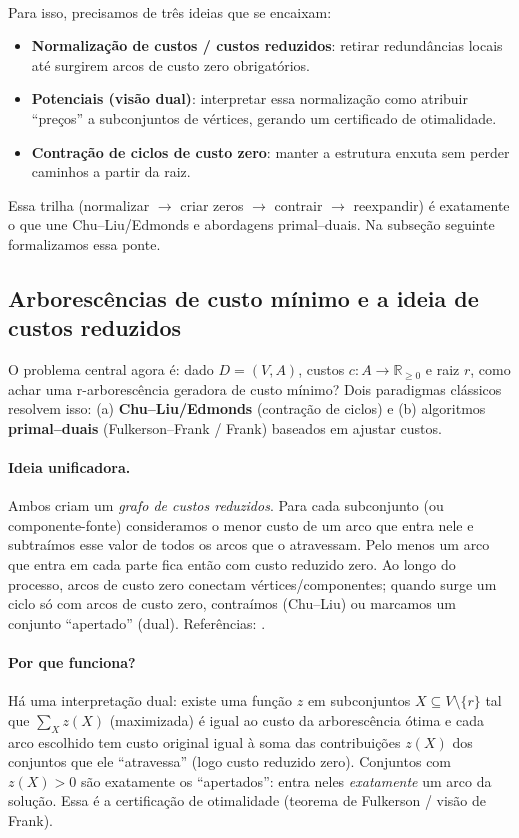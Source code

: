 \documentclass[12pt,a4paper]{article}
\begin{document}
\paragraph{}
Para isso, precisamos de três ideias que se encaixam:
\begin{itemize}\setlength{\itemsep}{2pt}
    \item \textbf{Normalização de custos / custos reduzidos}: retirar redundâncias locais até surgirem arcos de custo zero obrigatórios.
    \item \textbf{Potenciais (visão dual)}: interpretar essa normalização como atribuir “preços” a subconjuntos de vértices, gerando um certificado de otimalidade.
    \item \textbf{Contração de ciclos de custo zero}: manter a estrutura enxuta sem perder caminhos a partir da raiz.
\end{itemize}
Essa trilha (normalizar \(\to\) criar zeros \(\to\) contrair \(\to\) reexpandir) é exatamente o que une Chu--Liu/Edmonds e abordagens primal--duais. Na subseção seguinte formalizamos essa ponte.


\subsection{Arborescências de custo mínimo e a ideia de custos reduzidos}


O problema central agora é: dado $D=(V,A)$, custos $c:A\to \mathbb{R}_{\ge 0}$ e raiz $r$, como achar uma r-arborescência geradora de custo mínimo? Dois paradigmas clássicos resolvem isso: (a) \textbf{Chu--Liu/Edmonds} (contração de ciclos) e (b) algoritmos \textbf{primal--duais} (Fulkerson–Frank / Frank) baseados em ajustar custos.

\paragraph{Ideia unificadora.} Ambos criam um \emph{grafo de custos reduzidos}. Para cada subconjunto (ou componente-fonte) consideramos o menor custo de um arco que entra nele e subtraímos esse valor de todos os arcos que o atravessam. Pelo menos um arco que entra em cada parte fica então com custo reduzido zero. Ao longo do processo, arcos de custo zero conectam vértices/componentes; quando surge um ciclo só com arcos de custo zero, contraímos (Chu--Liu) ou marcamos um conjunto “apertado” (dual). Referências: \cite{chu1965, edmonds1967optimum, frank2014connections, schrijver2003comb}.

\paragraph{Por que funciona?} Há uma interpretação dual: existe uma função $z$ em subconjuntos $X\subseteq V\setminus\{r\}$ tal que \(\sum_X z(X)\) (maximizada) é igual ao custo da arborescência ótima e cada arco escolhido tem custo original igual à soma das contribuições $z(X)$ dos conjuntos que ele “atravessa” (logo custo reduzido zero). Conjuntos com $z(X)>0$ são exatamente os “apertados”: entra neles \emph{exatamente} um arco da solução. Essa é a certificação de otimalidade (teorema de Fulkerson / visão de Frank).
\end{document}
